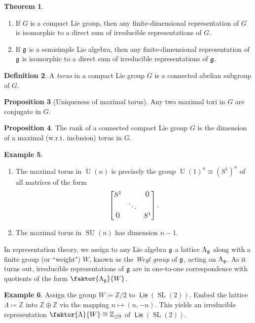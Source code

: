 \documentclass[10pt,letterpaper,cm]{nupset}
\theoremstyle{definition}
\newtheorem{defn}{Definition}[subsection]
\newtheorem{exmp}[defn]{Example}
\theoremstyle{theorem}
\newtheorem{theorem}[defn]{Theorem}
\newtheorem{prop}[defn]{Proposition}
\theoremstyle{remark}
\newcommand{\Z}{\mathbb Z}
\newcommand{\1}{\mathbb{1}}
\newcommand{\0}{\vec 0}
\DeclareMathOperator{\SU}{SU}
\DeclareMathOperator{\SL}{SL}
\DeclareMathOperator{\U}{U}
\DeclareMathOperator{\lie}{\mathsf{Lie}}
\newcommand{\be}{\begin{enumerate}}
\newcommand{\ee}{\end{enumerate}}
\begin{document}
\smallskip

\begin{theorem} $ $
\be
\item If $G$ is a  compact Lie group, then any finite-dimensional representation of $G$ is isomorphic to a direct sum of irreducible representations of $G$. 
\item If $\frak{g}$ is a  semisimple Lie algebra, then any finite-dimensional representation of $\frak{g}$ is isomorphic to a direct sum of irreducible representations of $\frak{g}$. 
\ee
\end{theorem}

\medskip

\begin{defn}
A \textit{torus} in a compact Lie group $G$ is a connected abelian subgroup of $G$.
\end{defn}

\begin{prop}[Uniqueness of maximal torus]
Any two maximal tori in $G$ are conjugate in $G$.
\end{prop}

\begin{prop}
The rank of a connected compact Lie group $G$ is  the dimension of a maximal (w.r.t. inclusion) torus in $G$.
\end{prop}

\begin{exmp} $ $
\be
\item  The maximal torus in $\U(n)$ is precisely the group $\U(1)^n \cong \left(S^1\right)^n$ of all matrices of the form
\[
\begin{bmatrix} S^1 &  &  \text{\large0} \\ & \ddots & \\  \text{\large0} & & S^1 \end{bmatrix}.
\]
\item The maximal torus in $\SU(n)$ has dimension $n-1$.
\ee
\end{exmp}


\bigskip

In representation theory, we assign to any Lie algebra $\frak{g}$ a lattice $\Lambda_{\frak{g}}$ along with a finite group (or ``weight") $W$, known as the \textit{Weyl group} of $\frak{g}$, acting on $\Lambda_{\frak{g}}$. As it turns out, irreducible representations of $\frak{g}$ are in one-to-one correspondence with  quotients of the form $\faktor{\Lambda_{\frak{g}}}{W}$.

\begin{exmp}
Assign the group $W\coloneqq \Z/2$ to $\lie(\SL(2))$. Embed the lattice $\Lambda \coloneqq \Z$ into $\Z \oplus \Z$ via the mapping $n \mapsto \left(n, {-n}\right)$. This yields an irreducible representation $\faktor{\Lambda}{W} \cong \Z_{\geq 0}$ of $\lie(\SL(2))$.
\end{exmp}
\end{document}
